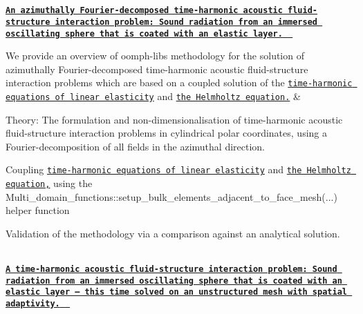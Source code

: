\begin{longtabu}
\\
\\
\href{../../fourier_decomposed_acoustic_fsi/sphere/html/index.html}{\tt {\bfseries  An azimuthally Fourier-\/decomposed time-\/harmonic acoustic fluid-\/structure interaction problem\+: Sound radiation from an immersed oscillating sphere that is coated with an elastic layer. } }

We provide an overview of {\ttfamily oomph-\/lib\textquotesingle{}s} methodology for the solution of azimuthally Fourier-\/decomposed time-\/harmonic acoustic fluid-\/structure interaction problems which are based on a coupled solution of the \href{../../time_harmonic_fourier_decomposed_linear_elasticity/cylinder/html/index.html}{\tt time-\/harmonic equations of linear elasticity} and \href{../../fourier_decomposed_helmholtz/sphere_scattering/html/index.html}{\tt the Helmholtz equation.}  &
\begin{DoxyItemize}
\item Theory\+: The formulation and non-\/dimensionalisation of time-\/harmonic acoustic fluid-\/structure interaction problems in cylindrical polar coordinates, using a Fourier-\/decomposition of all fields in the azimuthal direction.
\item Coupling \href{../../time_harmonic_fourier_decomposed_linear_elasticity/cylinder/html/index.html}{\tt time-\/harmonic equations of linear elasticity} and \href{../../fourier_decomposed_helmholtz/sphere_scattering/html/index.html}{\tt the Helmholtz equation,} using the {\ttfamily Multi\+\_\+domain\+\_\+functions\+::setup\+\_\+bulk\+\_\+elements\+\_\+adjacent\+\_\+to\+\_\+face\+\_\+mesh}(...) helper function
\item Validation of the methodology via a comparison against an analytical solution. 
\end{DoxyItemize}

\\
\href{../../fourier_decomposed_acoustic_fsi/unstructured_sphere/html/index.html}{\tt {\bfseries  A time-\/harmonic acoustic fluid-\/structure interaction problem\+: Sound radiation from an immersed oscillating sphere that is coated with an elastic layer -- this time solved on an unstructured mesh with spatial adaptivity. } }


\end{longtabu}
